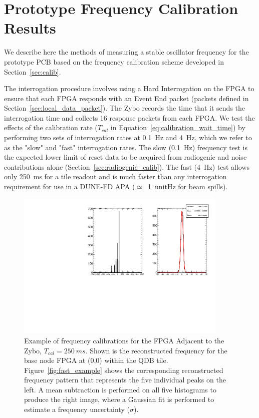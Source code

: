 \section{Prototype Frequency Calibration Results}
\label{sec:freq_calib_results}
We describe here the methods of measuring a stable oscillator frequency for the prototype PCB based on the frequency calibration scheme developed in Section~\ref{sec:calib}.

The interrogation procedure involves using a Hard Interrogation on the FPGA to ensure that each FPGA responds with an Event End packet (packets defined in Section~\ref{sec:local_data_packet}).
The Zybo records the time that it sends the interrogation time and collects 16 response packets from each FPGA.
We test the effects of the calibration rate ($T_{cal}$ in Equation~\ref{eq:calibration_wait_time}) by performing two sets of interrogation rates at 0.1~\unit{Hz} and 4~\unit{Hz}, which we refer to as the "slow" and "fast" interrogation rates.
The slow (0.1~\unit{Hz}) frequency test is the expected lower limit of reset data to be acquired from radiogenic and noise contributions alone (Section~\ref{sec:radiogenic_calib}).
The fast (4~\unit{Hz}) test allows only 250~\unit{ms} for a tile readout and is much faster than any interrogation requirement for use in a DUNE-FD APA ($\simeq$~1~unit{Hz} for beam spills). 

\begin{figure}[]
\centering
\includegraphics[width=0.9\textwidth]{images/(0,0).pdf}
\caption{Example of frequency calibrations for the FPGA Adjacent to the Zybo, $T_{cal} = 250~\unit{ms}$.
Shown is the reconstructed frequency for the base node FPGA at (0,0) within the QDB tile.
Figure~\ref{fig:fast_example} shows the corresponding reconstructed frequency pattern that represents the five individual peaks on the left.
A mean subtraction is performed on all five histograms to produce the right image, where a Gaussian fit is performed to estimate a frequency uncertainty ($\sigma$).
}
\label{fig:frq_recon_node00}
\end{figure}

